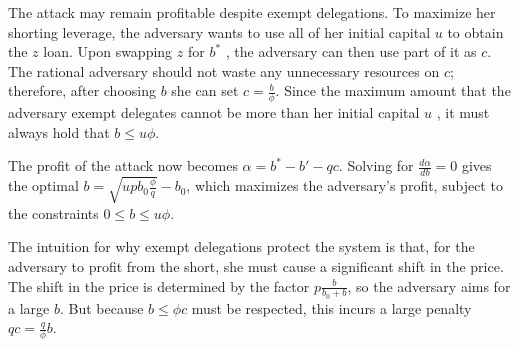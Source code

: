 The attack may remain profitable despite exempt delegations.
To maximize her shorting leverage, the adversary wants to use all
of her initial capital $u$ \asset to obtain the $z$ \stasset loan.
Upon swapping $z$ for $b^*$ \asset, the adversary can then use part of it as $c$.
The rational adversary should not waste any unnecessary resources on
$c$; therefore, after choosing $b$ she can set $c = \frac{b}{\phi}$.
Since the maximum amount that the adversary exempt delegates
cannot be more than her initial capital $u$ \asset,
it must always hold that $b \leq u\phi$.

The profit of the attack now becomes $\alpha = b^* - b' - qc$.
Solving for $\frac{d\alpha}{db} = 0$ gives the optimal $b = \sqrt{u p b_0 \frac{\phi}{q}} - b_0$,
which maximizes
the adversary's profit, subject to the constraints
$0 \leq b \leq u\phi$.


The intuition for why exempt delegations protect the system is that,
for the adversary to profit from the short, she must cause a significant
shift in the price. The shift in the price is determined by the factor
$p\frac{b}{b_0 + b}$, so the adversary aims for a large $b$. But because $b \leq \phi c$
must be respected, this incurs a large penalty $qc = \frac{q}{\phi}b$.

%



